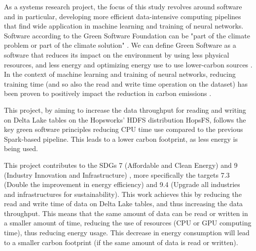 As a systems research project, the focus of this study revolves around software and in particular, developing more efficient data-intensive computing pipelines that find wide application in machine learning and training of neural networks. Software according to the Green Software Foundation \cite{GreenSoftwareFoundation} can be "part of the climate problem or part of the climate solution" \cite{WhatGreenSoftware2021}. We can define Green Software as a software that reduces its impact on the environment by using less physical resources, and less energy and optimizing energy use to use lower-carbon sources \cite{WhatGreenSoftware2021}. In the context of machine learning and training of neural networks, reducing training time (and so also the read and write time operation on the dataset) has been proven to positively impact the reduction in carbon emissions \cite{pattersonCarbonEmissionsLarge2021,pattersonCarbonFootprintMachine2022}.

This project, by aiming to increase the data throughput for reading and writing on Delta Lake tables on the Hopsworks' \gls{HDFS} distribution HopsFS, follows the key green software principles reducing CPU time use compared to the previous Spark-based pipeline. This leads to a lower carbon footprint, as less energy is being used.

This project contributes to the \glspl{SDG} 7 (Affordable and Clean Energy) and 9 (Industry Innovation and Infrastructure) \cite{SustainableDevelopment}, more specifically the targets 7.3 (Double the improvement in energy efficiency) and 9.4 (Upgrade all industries and infrastructures for sustainability). This work achieves this by reducing the read and write time of data on Delta Lake tables, and thus increasing the data throughput. This means that the same amount of data can be read or written in a smaller amount of time, reducing the use of resources (CPU or GPU computing time), thus reducing energy usage. This decrease in energy consumption will lead to a smaller carbon footprint (if the same amount of data is read or written). 

